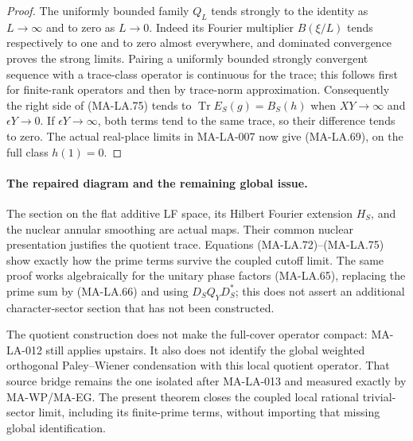 \begin{proof}
The uniformly bounded family $Q_L$ tends strongly to the
identity as $L\to\infty$ and to zero as $L\to0$.
Indeed its Fourier multiplier $B(\xi/L)$ tends respectively
to one and to zero almost everywhere, and dominated
convergence proves the strong limits.  Pairing a uniformly
bounded strongly convergent sequence with a trace-class
operator is continuous for the trace; this follows first
for finite-rank operators and then by trace-norm approximation.
Consequently the right side of (MA-LA.75) tends to
$\operatorname{Tr}E_S(g)=B_S(h)$ when $XY\to\infty$
and $\epsilon Y\to0$.  If $\epsilon Y\to\infty$, both
terms tend to the same trace, so their difference tends to zero.
The actual real-place limits in MA-LA-007 now give
(MA-LA.69), on the full class $h(1)=0$.
\end{proof}

\paragraph{The repaired diagram and the remaining global issue.}
The section on the flat additive LF space, its Hilbert
Fourier extension $H_S$, and the nuclear annular smoothing
are actual maps.  Their common nuclear presentation justifies
the quotient trace.  Equations (MA-LA.72)--(MA-LA.75) show
exactly how the prime terms survive the coupled cutoff limit.
The same proof works algebraically for the unitary phase
factors (MA-LA.65), replacing the prime sum by (MA-LA.66)
and using $D_SQ_YD_S^*$; this does not assert an additional
character-sector section that has not been constructed.

The quotient construction does not make the full-cover
operator compact: MA-LA-012 still applies upstairs.
It also does not identify the global weighted orthogonal
Paley--Wiener condensation with this local quotient operator.
That source bridge remains the one isolated after
MA-LA-013 and measured exactly by MA-WP/MA-EG.
The present theorem closes the coupled local rational
trivial-sector limit, including its finite-prime terms,
without importing that missing global identification.
